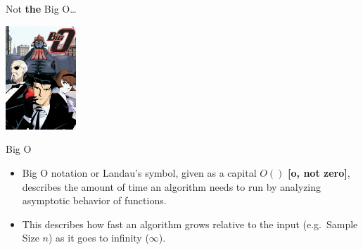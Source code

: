 \begin{frame}{Not \textbf{the} Big O\ldots{}}

\begin{center}\includegraphics[width=100px]{figures/the_big_o} \end{center}

\end{frame}

\begin{frame}{Big O}

\begin{itemize}
\tightlist
\item
  Big O notation or Landau's symbol, given as a capital \(O()\)
  \textbf{{[}o, not zero{]}}, describes the amount of time an algorithm
  needs to run by analyzing asymptotic behavior of functions.
\item
  This describes how fast an algorithm grows relative to the input
  (e.g.~Sample Size \(n\)) as it goes to infinity (\(\infty\)).
\end{itemize}

\end{frame}

